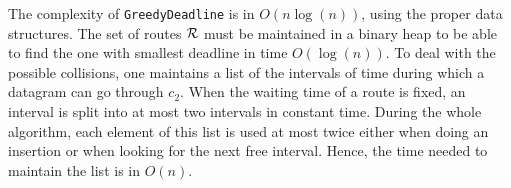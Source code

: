 \documentclass[a4paper,10pt]{journal}
\newcommand\greedydeadline{\texttt{GreedyDeadline}\xspace}
\begin{document}
     
   
       
      

   


    The complexity of \greedydeadline is in $O(n\log(n))$, using the proper data structures. The set of routes $\cal{R}$ must be maintained in a binary heap to be able to find the one with smallest deadline in time $O(\log(n))$. To deal with the possible collisions, one maintains a list of the intervals
    of time during which a datagram can go through $c_2$. When the waiting time of a route is fixed, an interval is split into at most two intervals in constant time. During the whole algorithm, each element of this list is used at most twice either when doing an insertion or when looking for the next free interval. Hence, the time needed to maintain the list is in $O(n)$. 
  
\end{document}
